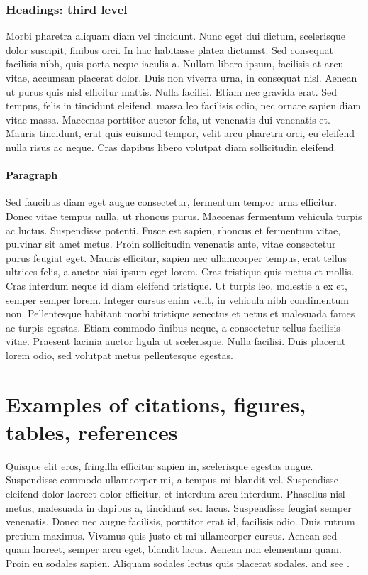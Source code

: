 \documentclass{article}
\begin{document}
\subsubsection{Headings: third level}
Morbi pharetra aliquam diam vel tincidunt. Nunc eget dui dictum, scelerisque dolor suscipit, finibus orci. In hac habitasse platea dictumst. Sed consequat facilisis nibh, quis porta neque iaculis a. Nullam libero ipsum, facilisis at arcu vitae, accumsan placerat dolor. Duis non viverra urna, in consequat nisl. Aenean ut purus quis nisl efficitur mattis. Nulla facilisi. Etiam nec gravida erat. Sed tempus, felis in tincidunt eleifend, massa leo facilisis odio, nec ornare sapien diam vitae massa. Maecenas porttitor auctor felis, ut venenatis dui venenatis et. Mauris tincidunt, erat quis euismod tempor, velit arcu pharetra orci, eu eleifend nulla risus ac neque. Cras dapibus libero volutpat diam sollicitudin eleifend. 


\paragraph{Paragraph}
Sed faucibus diam eget augue consectetur, fermentum tempor urna efficitur. Donec vitae tempus nulla, ut rhoncus purus. Maecenas fermentum vehicula turpis ac luctus. Suspendisse potenti. Fusce est sapien, rhoncus et fermentum vitae, pulvinar sit amet metus. Proin sollicitudin venenatis ante, vitae consectetur purus feugiat eget. Mauris efficitur, sapien nec ullamcorper tempus, erat tellus ultrices felis, a auctor nisi ipsum eget lorem. Cras tristique quis metus et mollis. Cras interdum neque id diam eleifend tristique. Ut turpis leo, molestie a ex et, semper semper lorem. Integer cursus enim velit, in vehicula nibh condimentum non. Pellentesque habitant morbi tristique senectus et netus et malesuada fames ac turpis egestas. Etiam commodo finibus neque, a consectetur tellus facilisis vitae. Praesent lacinia auctor ligula ut scelerisque. Nulla facilisi. Duis placerat lorem odio, sed volutpat metus pellentesque egestas. 


\section{Examples of citations, figures, tables, references}
\label{sec:others}
Quisque elit eros, fringilla efficitur sapien in, scelerisque egestas augue. Suspendisse commodo ullamcorper mi, a tempus mi blandit vel. Suspendisse eleifend dolor laoreet dolor efficitur, et interdum arcu interdum. Phasellus nisl metus, malesuada in dapibus a, tincidunt sed lacus. Suspendisse feugiat semper venenatis. Donec nec augue facilisis, porttitor erat id, facilisis odio. Duis rutrum pretium maximus. Vivamus quis justo et mi ullamcorper cursus. Aenean sed quam laoreet, semper arcu eget, blandit lacus. Aenean non elementum quam. Proin eu sodales sapien. Aliquam sodales lectus quis placerat sodales. \cite{kour2014real,kour2014fast} and see \cite{hadash2018estimate}.
\end{document}
